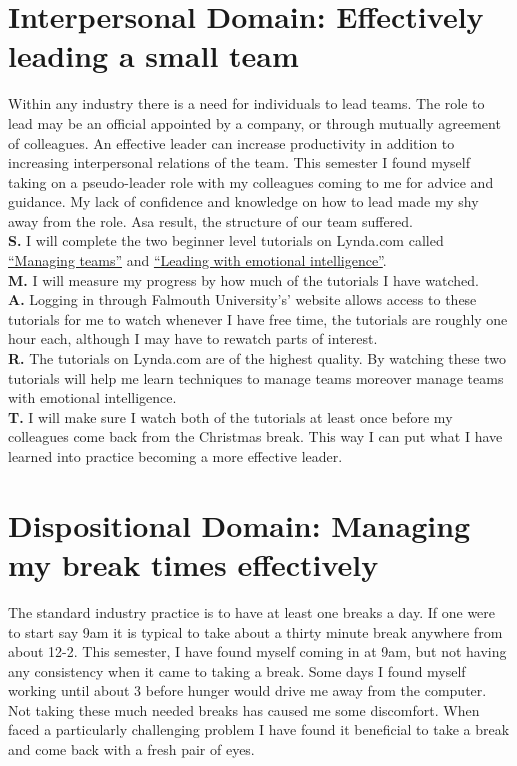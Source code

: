 \documentclass{scrartcl}
\begin{document}
\section{Interpersonal Domain: Effectively leading a small team}
 Within any industry there is a need for individuals to lead teams. The role to lead may be an official appointed by a company, or through mutually agreement of colleagues. An effective leader can increase productivity in addition to increasing interpersonal relations of the team. This semester I found myself taking on a pseudo-leader role with my colleagues coming to me for advice and guidance. My lack of confidence and knowledge on how to lead made my shy away from the role. Asa result, the structure of our team suffered.\\
\textbf{S.} I will complete the two beginner level tutorials on Lynda.com called \href{https://www.lynda.com/course-tutorials/Managing-Teams-2018/746304-2.html}{``Managing teams''} and  \href{https://www.lynda.com/Leadership-Management-tutorials/Inspirational-leadership/756283/5006410-4.html}{``Leading with emotional intelligence''}. \\
\textbf{M.}  I will measure my progress by how much of the tutorials I have watched. \\
\textbf{A.}  Logging in through Falmouth University's' website allows access to these tutorials for me to watch whenever I have free time, the tutorials are roughly one hour each, although I may have to rewatch parts of interest.\\
\textbf{R.} The tutorials on Lynda.com are of the highest quality. By watching these two tutorials will help me learn techniques to manage teams moreover manage teams with emotional intelligence. \\
\textbf{T.} I will make sure I watch both of the tutorials at least once before my colleagues come back from the Christmas break. This way I can put what I have learned into practice becoming a more effective leader.\\

\section{Dispositional Domain: Managing my break times effectively}
The standard industry practice is to have at least one breaks a day. If one were to start say 9am it is typical to take about a thirty minute break anywhere from about 12-2. This semester, I have found myself coming in at 9am, but not having any consistency when it came to taking a break. Some days I found myself working until about 3 before hunger would drive me away from the computer. Not taking these much needed breaks has caused me some discomfort. When faced a particularly challenging problem I have found it beneficial to take a break and come back with a fresh pair of eyes. \\
\end{document}
